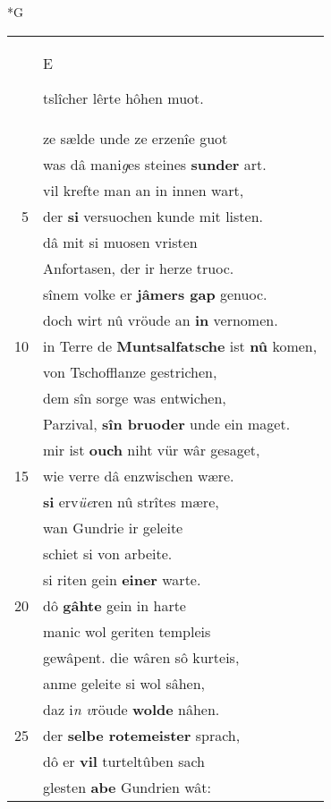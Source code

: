 \documentclass[8pt,a4paper,notitlepage]{article}
\begin{document}
\begin{table}[ht]
\begin{minipage}[t]{0.5\linewidth}
\small
\begin{center}*G
\end{center}
\begin{tabular}{rl}
 & \begin{large}E\end{large}tslîcher lêrte hôhen muot.\\ 
 & ze sælde unde ze erzenîe guot\\ 
 & was dâ mani\textit{g}es steines \textbf{sunder} art.\\ 
 & vil krefte man an in innen wart,\\ 
5 & der \textbf{si} versuochen kunde mit listen.\\ 
 & dâ mit si muosen vristen\\ 
 & Anfortasen, der ir herze truoc.\\ 
 & sînem volke er \textbf{jâmers gap} genuoc.\\ 
 & doch wirt nû vröude an \textbf{in} vernomen.\\ 
10 & in Terre de \textbf{Muntsalfatsche} ist \textbf{nû} komen,\\ 
 & von Tschofflanze gestrichen,\\ 
 & dem sîn sorge was entwichen,\\ 
 & Parzival, \textbf{sîn bruoder} unde ein maget.\\ 
 & mir ist \textbf{ouch} niht vür wâr gesaget,\\ 
15 & wie verre dâ enzwischen wære.\\ 
 & \textbf{si} erv\textit{üe}ren nû strîtes mære,\\ 
 & wan Gundrie ir geleite\\ 
 & schiet si von arbeite.\\ 
 & si riten gein \textbf{einer} warte.\\ 
20 & dô \textbf{gâhte} gein in harte\\ 
 & manic wol geriten templeis\\ 
 & gewâpent. die wâren sô kurteis,\\ 
 & anme geleite si wol sâhen,\\ 
 & daz i\textit{n} \textit{v}röude \textbf{wolde} nâhen.\\ 
25 & der \textbf{selbe rotemeister} sprach,\\ 
 & dô er \textbf{vil} turteltûben sach\\ 
 & glesten \textbf{abe} Gundrien wât:\\ 

\end{tabular}
\end{minipage}
\end{table}
\end{document}
